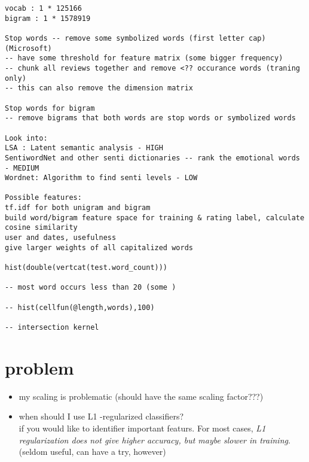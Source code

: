 \documentclass[12pt,a4paper]{article}
\begin{document}
\setcounter{tocdepth}{3}
\tableofcontents
\vspace*{1cm}
\begin{verbatim}
vocab : 1 * 125166
bigram : 1 * 1578919

Stop words -- remove some symbolized words (first letter cap)(Microsoft)
-- have some threshold for feature matrix (some bigger frequency)
-- chunk all reviews together and remove <?? occurance words (traning only)
-- this can also remove the dimension matrix

Stop words for bigram
-- remove bigrams that both words are stop words or symbolized words

Look into:
LSA : Latent semantic analysis - HIGH
SentiwordNet and other senti dictionaries -- rank the emotional words
- MEDIUM
Wordnet: Algorithm to find senti levels - LOW

Possible features:
tf.idf for both unigram and bigram
build word/bigram feature space for training & rating label, calculate
cosine similarity
user and dates, usefulness
give larger weights of all capitalized words

hist(double(vertcat(test.word_count)))

-- most word occurs less than 20 (some )

-- hist(cellfun(@length,words),100)

-- intersection kernel

\end{verbatim}

\section{problem}
\begin{itemize}
\item my scaling is problematic (should have the same scaling factor???)
\item when should I use L1 -regularized classifiers? \\
  if you would like to identifier important featurs.
  For most cases, \emph{L1 regularization does not give higher accuracy,
    but maybe slower in training}. (seldom useful, can have a try, however)
  
\end{itemize}
\end{document}
